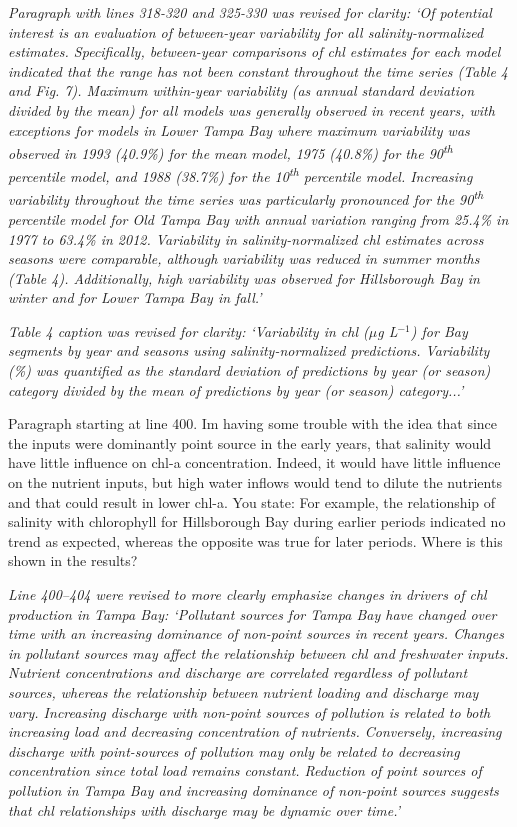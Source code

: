 \documentclass[letterpaper,12pt,oneside]{article}\usepackage[]{graphicx}\usepackage[]{color}
\newcommand{\mugl}{$\mu$g L$^{-1}$}
\newcommand{\nine}{90\textsuperscript{th} percentile }
\newcommand{\ten}{10\textsuperscript{th} percentile }
\begin{document}
\textit{Paragraph with lines 318-320 and 325-330 was revised for clarity: `Of potential interest is an evaluation of between-year variability for all salinity-normalized estimates.  Specifically, between-year comparisons of \ac{chl} estimates for each model indicated that the range has not been constant throughout the time series (Table 4 and Fig. 7).  Maximum within-year variability (as annual standard deviation divided by the mean) for all models was generally observed in recent years, with exceptions for models in Lower Tampa Bay where maximum variability was observed in 1993 (40.9\%) for the mean model, 1975 (40.8\%) for the \nine model, and 1988 (38.7\%) for the \ten model.  Increasing variability throughout the time series was particularly pronounced for the \nine model for Old Tampa Bay with annual variation ranging from 25.4\% in 1977  to 63.4\% in 2012.  Variability in salinity-normalized \ac{chl} estimates across seasons were comparable, although variability was reduced in summer months (Table 4).  Additionally, high variability was observed for Hillsborough Bay in winter and for Lower Tampa Bay in fall.'}

\textit{Table 4 caption was revised for clarity: `Variability in \ac{chl} (\mugl) for Bay segments by year and seasons using salinity-normalized predictions.  Variability (\%) was quantified as the standard deviation of predictions by year (or season) category divided by the mean of predictions by year (or season) category...'}

Paragraph starting at line 400.  Im having some trouble with the idea that since the inputs were dominantly point source in the early years, that salinity would have little influence on chl-a concentration.  Indeed, it would have little influence on the nutrient inputs, but high water inflows would tend to dilute the nutrients and that could result in lower chl-a.  You state: For example, the relationship of salinity with chlorophyll for Hillsborough Bay during earlier periods indicated no trend as expected, whereas the opposite was true for later periods.  Where is this shown in the results? 

\textit{Line 400--404 were revised to more clearly emphasize changes in drivers of \ac{chl} production in Tampa Bay: `Pollutant sources for Tampa Bay have changed over time with an increasing dominance of non-point sources in recent years.  Changes in pollutant sources may affect the relationship between \ac{chl} and freshwater inputs.  Nutrient concentrations and discharge are correlated regardless of pollutant sources, whereas the relationship between nutrient loading and discharge may vary.  Increasing discharge with non-point sources of pollution is related to both increasing load and decreasing concentration of nutrients.  Conversely, increasing discharge with point-sources of pollution may only be related to decreasing concentration since total load remains constant. Reduction of point sources of pollution in Tampa Bay and increasing dominance of non-point sources suggests that \ac{chl} relationships with discharge may be dynamic over time.'}
\end{document}

